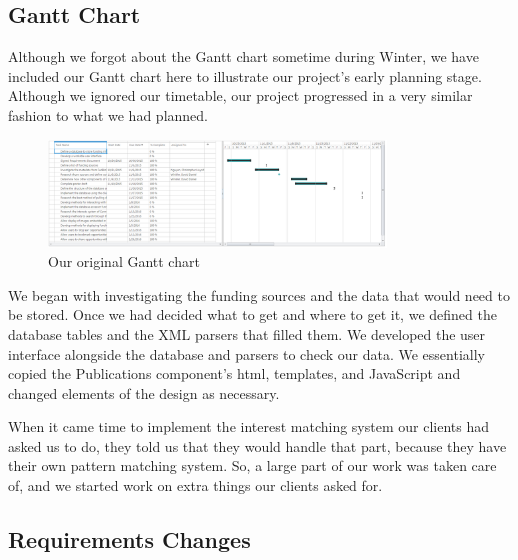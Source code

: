 \documentclass[onecolumn]{IEEEtran}
\begin{document}
\subsection{Gantt Chart}
Although we forgot about the Gantt chart sometime during Winter, we have included our Gantt chart here to illustrate our project's early planning stage. Although we ignored our timetable, our project progressed in a very similar fashion to what we had planned.  

\begin{figure}
    \centering
    \includegraphics[width=0.8\textwidth]{gantt.png}
    \caption{Our original Gantt chart}
    \label{fig:gantt}
\end{figure}

We began with investigating the funding sources and the data that would need to be stored. Once we had decided what to get and where to get it, we defined the database tables and the XML parsers that filled them. We developed the user interface alongside the database and parsers to check our data. We essentially copied the Publications component's html, templates, and JavaScript and changed elements of the design as necessary.  

When it came time to implement the interest matching system our clients had asked us to do, they told us that they would handle that part, because they have their own pattern matching system. So, a large part of our work was taken care of, and we started work on extra things our clients asked for. 

\subsection{Requirements Changes}
\end{document}
